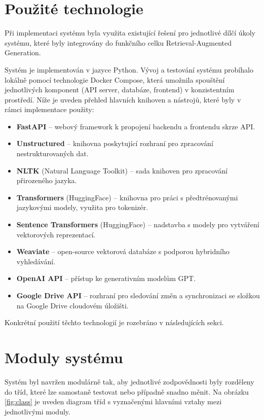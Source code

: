 \section{Použité technologie}
Při implementaci systému byla využita existující řešení pro jednotlivé dílčí úkoly systému, které byly integrovány do funkčního celku Retrieval-Augmented Generation. 

Systém je implementován v jazyce Python. Vývoj a testování systému probíhalo lokálně pomocí technologie Docker Compose, která umožnila spouštění jednotlivých komponent (API server, databáze, frontend) v konzistentním prostředí. Níže je uveden přehled hlavních knihoven a nástrojů, které byly v rámci implementace použity:
\begin{itemize}
    \item \textbf{FastAPI} – webový framework k propojení backendu a frontendu skrze API.
    \item \textbf{Unstructured} – knihovna poskytující rozhraní pro zpracování nestrukturovaných dat.
    \item \textbf{NLTK} (Natural Language Toolkit) – sada knihoven pro zpracování přirozeného jazyka.
    \item \textbf{Transformers} (HuggingFace) – knihovna pro práci s předtrénovanými jazykovými modely, využita pro tokenizér. 
    \item \textbf{Sentence Transformers} (HuggingFace) – nadstavba s modely pro vytváření vektorových reprezentací.
    \item \textbf{Weaviate} – open-source vektorová databáze s podporou hybridního vyhledávání.
    \item \textbf{OpenAI API} – přístup ke generativním modelům GPT.
    \item \textbf{Google Drive API} – rozhraní pro sledování změn a synchronizaci se složkou na Google Drive cloudovém úložišti.
\end{itemize}

Konkrétní použití těchto technologií je rozebráno v následujících sekci.

\section{Moduly systému}
Systém byl navržen modulárně tak, aby jednotlivé zodpovědnosti byly rozděleny do tříd, které lze samostaně testovat nebo případně snadno měnit. Na obrázku \ref{fig:class} je uveden diagram tříd s vyznačenými hlavními vztahy mezi jednotlivými moduly.


